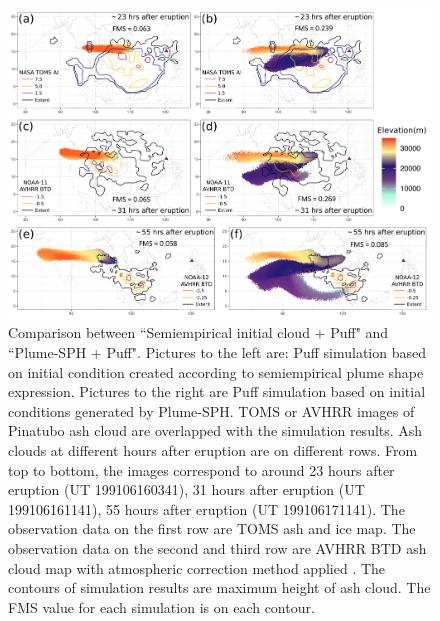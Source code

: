 \documentclass[utf8]{frontiersSCNS} %
\begin{document}
\begin{figure}[!htb]
\centering
\includegraphics[width=0.99 \textwidth]{Figures/bent_plume-maximum-height}
\caption{Comparison between ``Semiempirical initial cloud + Puff" and ``Plume-SPH + Puff". Pictures to the left are: Puff simulation based on initial condition created according to semiempirical plume shape expression. Pictures to the right are Puff simulation based on initial conditions generated by Plume-SPH. TOMS or AVHRR images of Pinatubo ash cloud are overlapped with the simulation results. Ash clouds at different hours after eruption are on different rows. From top to bottom, the images correspond to around 23 hours after eruption (UT 199106160341), 31 hours after eruption (UT 199106161141), 55 hours after eruption (UT 199106171141). The observation data on the first row are TOMS ash and ice map. The observation data on the second and third row are AVHRR BTD ash cloud map with atmospheric correction method applied \citep{guo2004particles}. The contours of simulation results are maximum height of ash cloud. The FMS value for each simulation is on each contour.}
\label{fig:Plume-SPH-Puff-ash-cloud-max-height}
\end{figure}
\end{document}
